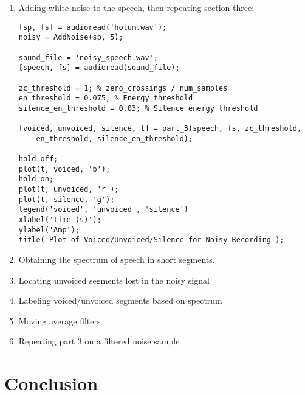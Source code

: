 \documentclass[11pt]{article}
\begin{document}
\begin{enumerate}
\begin{lstlisting}
% Identify voiced, unvoiced, and silence from basic recording
[voiced, unvoiced, silence, t] = part_3(speech, fs, zc_threshold, 
		en_threshold, silence_en_threshold);

hold off;
plot(t, voiced, 'b');
hold on;
plot(t, unvoiced, 'r');
plot(t, silence, 'g');
legend('voiced', 'unvoiced', 'silence')
xlabel('time (s)');
ylabel('Amp');
title('Plot of Voiced/Unvoiced/Silence for Standard Recording');
\end{lstlisting}

\item Adding white noise to the speech, then repeating section three:

\begin{lstlisting}
[sp, fs] = audioread('holum.wav');
noisy = AddNoise(sp, 5);

sound_file = 'noisy_speech.wav';
[speech, fs] = audioread(sound_file);

zc_threshold = 1; % zero_crossings / num_samples
en_threshold = 0.075; % Energy threshold
silence_en_threshold = 0.03; % Silence energy threshold

[voiced, unvoiced, silence, t] = part_3(speech, fs, zc_threshold, 
	en_threshold, silence_en_threshold);

hold off;
plot(t, voiced, 'b');
hold on;
plot(t, unvoiced, 'r');
plot(t, silence, 'g');
legend('voiced', 'unvoiced', 'silence')
xlabel('time (s)');
ylabel('Amp');
title('Plot of Voiced/Unvoiced/Silence for Noisy Recording');
\end{lstlisting}


\item Obtaining the spectrum of speech in short segments.


\item Locating unvoiced segments lost in the noisy signal


\item Labeling voiced/unvoiced segments based on spectrum


\item Moving average filters


\item Repeating part 3 on a filtered noise sample

\end{enumerate}



\section{Conclusion}
\end{document}
